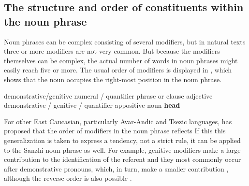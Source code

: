 
\subsection{The structure and order of constituents within the noun phrase}
\label{ssec:The structure and order of constituents within the noun phrase}

Noun phrases can be complex consisting of several modifiers, but in natural texts three or more modifiers are not very common. But because the modifiers themselves can be complex, the actual number of words in noun phrases might easily reach five or more. The usual order of modifiers is displayed in , which shows that the noun occupies the right-most position in the noun phrase.
%
\begin{exe}
	\ex	 demonstrative\slash genitive	\newline\hspace*{1.5em}	numeral / quantifier	\newline\hspace*{3.0em}	phrase or clause	\newline\hspace*{4.5em}	adjective	\newline\hspace*{6.0em}	demonstrative / genitive / quantifier	\newline\hspace*{7.5em}	appositive noun	\newline\hspace*{9.0em}	\textbf{head} 	\label{ex:Modifiers and their order in the NP}
\end{exe}

For other East Caucasian, particularly Avar-Andic and Tsezic languages, \citet[654]{Testelec1998a} has proposed that the order of modifiers in the noun phrase reflects  If this this generalization is taken to express a tendency, not a strict rule, it can be applied to the Sanzhi noun phrase as well. For example, genitive modifiers make a large contribution to the identification of the referent and they most commonly occur after demonstrative pronouns, which, in turn, make a smaller contribution , although the reverse order is also possible . 

